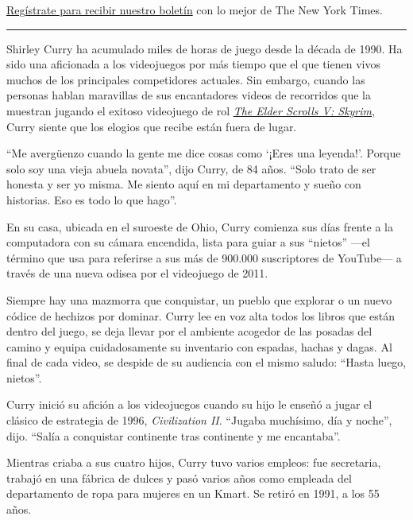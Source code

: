 \href{https://www.nytimes3xbfgragh.onion/newsletters/el-times}{Regístrate
para recibir nuestro boletín} con lo mejor de The New York Times.

\begin{center}\rule{0.5\linewidth}{\linethickness}\end{center}

Shirley Curry ha acumulado miles de horas de juego desde la década de
1990. Ha sido una aficionada a los videojuegos por más tiempo que el que
tienen vivos muchos de los principales competidores actuales. Sin
embargo, cuando las personas hablan maravillas de sus encantadores
videos de recorridos que la muestran jugando el exitoso videojuego de
rol
\href{https://www.nytimes3xbfgragh.onion/2011/11/26/arts/video-games/the-elder-scrolls-v-skyrim-video-game-review.html}{\emph{The
Elder Scrolls V: Skyrim}}, Curry siente que los elogios que recibe están
fuera de lugar.

``Me avergüenzo cuando la gente me dice cosas como `¡Eres una leyenda!'.
Porque solo soy una vieja abuela novata'', dijo Curry, de 84 años.
``Solo trato de ser honesta y ser yo misma. Me siento aquí en mi
departamento y sueño con historias. Eso es todo lo que hago''.

En su casa, ubicada en el suroeste de Ohio, Curry comienza sus días
frente a la computadora con su cámara encendida, lista para guiar a sus
``nietos'' ---el término que usa para referirse a sus más de 900.000
suscriptores de YouTube--- a través de una nueva odisea por el
videojuego de 2011.

Siempre hay una mazmorra que conquistar, un pueblo que explorar o un
nuevo códice de hechizos por dominar. Curry lee en voz alta todos los
libros que están dentro del juego, se deja llevar por el ambiente
acogedor de las posadas del camino y equipa cuidadosamente su inventario
con espadas, hachas y dagas. Al final de cada video, se despide de su
audiencia con el mismo saludo: ``Hasta luego, nietos''.

Curry inició su afición a los videojuegos cuando su hijo le enseñó a
jugar el clásico de estrategia de 1996, \emph{Civilization II}. ``Jugaba
muchísimo, día y noche'', dijo. ``Salía a conquistar continente tras
continente y me encantaba''.

Mientras criaba a sus cuatro hijos, Curry tuvo varios empleos: fue
secretaria, trabajó en una fábrica de dulces y pasó varios años como
empleada del departamento de ropa para mujeres en un Kmart. Se retiró en
1991, a los 55 años.

